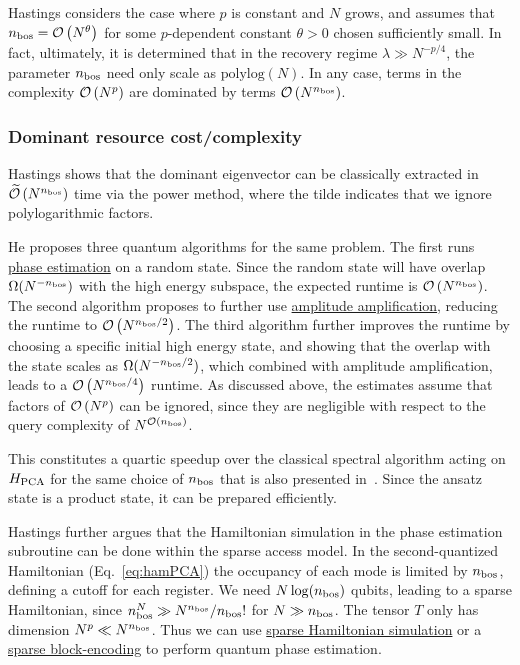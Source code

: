 \begin{refsection}
Hastings considers the case where $p$ is constant and $N$ grows, and assumes that $n_{\rm bos} = \mathcal{O}\left( N^\theta \right)$ for some $p$-dependent constant $\theta > 0$ chosen sufficiently small. In fact, ultimately, it is determined that in the recovery regime $\lambda \gg N^{-p/4}$, the parameter $n_{\rm bos}$ need only scale as $\mathrm{polylog}(N)$.  In any case, terms in the complexity $\mathcal{O}\left( N^p \right)$ are dominated by terms $\mathcal{O}\left( N^{n_{\rm bos}} \right)$.




\subsubsection*{Dominant resource cost/complexity}
Hastings shows that the dominant eigenvector can be classically extracted in $\widetilde{\mathcal{O}}\left( N^{n_{\rm bos}} \right)$ time via the power method, where the tilde indicates that we ignore polylogarithmic factors.

He proposes three quantum algorithms for the same problem. The first runs \hyperref[prim:QPE]{phase estimation} on a random state. Since the random state will have overlap $\Omega(N^{-n_{\rm bos}})$ with the high energy subspace, the expected runtime is $\mathcal{O}\left( N^{n_{\rm bos}} \right)$. The second algorithm proposes to further use \hyperref[prim:AmpAmp]{amplitude amplification}, reducing the runtime to $\mathcal{O}\left( N^{n_{\rm bos}/2} \right)$. The third algorithm further improves the runtime by choosing a specific initial high energy state, and showing that the overlap with the state scales as $\Omega(N^{-n_{\rm bos}/2})$, which combined with amplitude amplification, leads to a $\mathcal{O}\left( N^{n_{\rm bos}/4} \right)$ runtime. As discussed above, the estimates assume that factors of $\mathcal{O}\left( N^p \right)$ can be ignored, since they are negligible with respect to the query complexity of $N^{\mathcal{O}\left( n_{\rm bos} \right)}$.

This constitutes a quartic speedup over the classical spectral algorithm acting on $H_{\rm PCA}$ for the same choice of $n_{\rm bos}$ that is also presented in~\cite{hastings2020classical}. Since the ansatz state is a product state, it can be prepared efficiently.

Hastings further argues that the Hamiltonian simulation in the phase estimation subroutine can be done within the sparse access model. In the second-quantized Hamiltonian (Eq.~\eqref{eq:hamPCA}) the occupancy of each mode is limited by $n_{\rm bos}$, defining a cutoff for each register. We need $N \log(n_{\rm bos})$ qubits, leading to a sparse Hamiltonian, since $n_{\rm bos}^N\gg N^{n_{\rm bos}}/n_{\rm bos}!$ for $N\gg n_{\rm bos}$. The tensor $T$ only has dimension $N^p\ll N^{n_{\rm bos}}$. Thus we can use \hyperref[prim:HamiltonianSimulation]{sparse Hamiltonian simulation} or a \hyperref[prim:BlockEncodings]{sparse block-encoding} to perform quantum phase estimation. 




\end{refsection}

